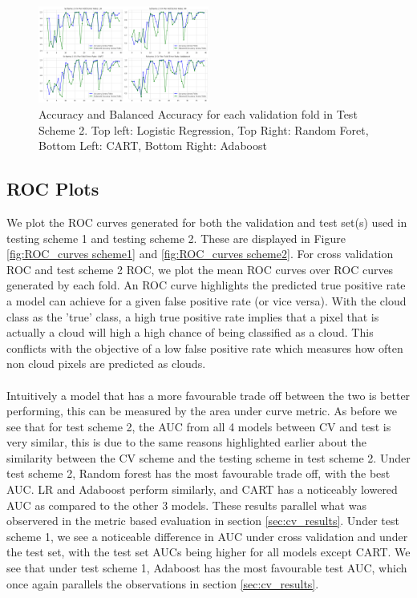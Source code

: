 \documentclass[11pt, letterpaper, journal]{IEEEtran}
\begin{document}
\begin{figure}[h]
\centering
\includegraphics[width=0.5\textwidth]{statics/test_Scheme2_fold_error.png}
\caption{Accuracy and Balanced Accuracy for each validation fold in Test Scheme 2. Top left: Logistic Regression, Top Right: Random Foret, Bottom Left: CART, Bottom Right: Adaboost}
\label{fig:fold_results_2}
\end{figure}


\subsection{ROC Plots}
We plot the ROC curves generated for both the validation and test set(s) used in testing scheme 1 and testing scheme 2. These are displayed in Figure \ref{fig:ROC_curves scheme1} and \ref{fig:ROC_curves scheme2}. For cross validation ROC and test scheme 2 ROC, we plot the mean ROC curves over ROC curves generated by each fold. An ROC curve highlights the predicted true positive rate a model can achieve for a given false positive rate (or vice versa). With the cloud class as the 'true' class, a high true positive rate implies that a pixel that is actually a cloud will high a high chance of being classified as a cloud. This conflicts with the objective of a low false positive rate which measures how often non cloud pixels are predicted as clouds. 
\\  
\\
Intuitively a model that has a more favourable trade off between the two is better performing, this can be measured by the area under curve metric. As before we see that for test scheme 2, the AUC from all 4 models between CV and test is very similar, this is due to the same reasons highlighted earlier about the similarity between the CV scheme and the testing scheme in test scheme 2. Under test scheme 2, Random forest has the most favourable trade off, with the best AUC. LR and Adaboost perform similarly, and CART has a noticeably lowered AUC as compared to the other 3 models. These results parallel what was observered in the metric based evaluation in section \ref{sec:cv_results}. Under test scheme 1, we see a noticeable difference in AUC under cross validation and under the test set, with the test set AUCs being higher for all models except CART. We see that under test scheme 1, Adaboost has the most favourable test AUC, which once again parallels the observations in section \ref{sec:cv_results}.
\end{document}
